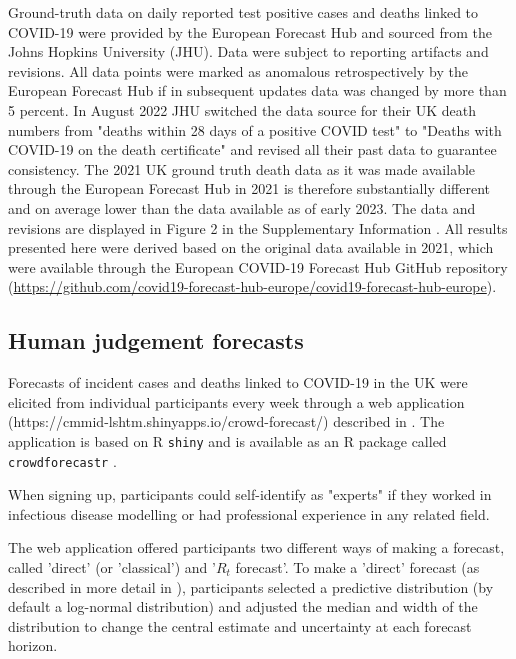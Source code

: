 \documentclass[10pt,a4paper,twocolumn]{article}
\begin{document}
Ground-truth data on daily reported test positive cases and deaths linked to COVID-19 were provided by the European Forecast Hub and sourced from the Johns Hopkins University (JHU). Data were subject to reporting artifacts and revisions. All data points were marked as anomalous retrospectively by the European Forecast Hub if in subsequent updates data was changed by more than 5 percent. In August 2022 JHU switched the data source for their UK death numbers from "deaths within 28 days of a positive COVID test" to "Deaths with COVID-19 on the death certificate" and revised all their past data to guarantee consistency. The 2021 UK ground truth death data as it was made available through the European Forecast Hub in 2021 is therefore substantially different and on average lower than the data available as of early 2023. The data and revisions are displayed in Figure 2 in the Supplementary Information \cite{bosseSupplementaryInformationHuman2023}. All results presented here were derived based on the original data available in 2021, which were available through the European COVID-19 Forecast Hub GitHub repository (\url{https://github.com/covid19-forecast-hub-europe/covid19-forecast-hub-europe}). 

\subsection*{Human judgement forecasts}

Forecasts of incident cases and deaths linked to COVID-19 in the UK were elicited from individual participants every week through a web application (https://cmmid-lshtm.shinyapps.io/crowd-forecast/) described in \cite{bosseComparingHumanModelbased2022}. The application is based on \textsf{R} \cite{R} \texttt{shiny} \cite{shiny} and is available as an \textsf{R} package called \texttt{crowdforecastr} \citep{crowdforecastr}. 

When signing up, participants could self-identify as "experts" if they worked in infectious disease modelling or had professional experience in any related field. 

The web application offered participants two different ways of making a forecast, called 'direct' (or 'classical') and '$R_t$ forecast'. To make a 'direct' forecast (as described in more detail in \cite{bosseComparingHumanModelbased2022}), participants selected a predictive distribution (by default a log-normal distribution) and adjusted the median and width of the distribution to change the central estimate and uncertainty at each forecast horizon. 
\end{document}
